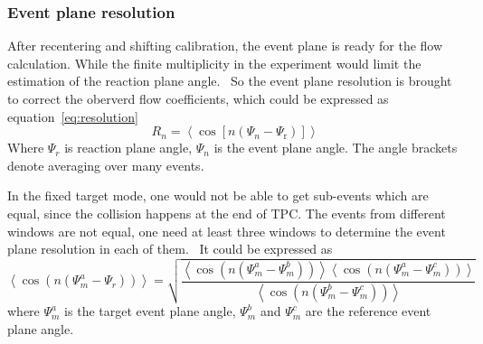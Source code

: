 \subsubsection{Event plane resolution}
After recentering and shifting calibration, the event plane is ready for the flow calculation. 
While the finite multiplicity in the experiment would limit the estimation of the reaction plane angle.~\cite{voloshin2008collective}
So the event plane resolution is brought to correct the oberverd flow coefficients, which could be expressed as equation~\ref{eq:resolution}
\begin{equation}
R_n=\left\langle\cos \left[n\left(\Psi_n-\Psi_{\mathrm{r}}\right)\right]\right\rangle
\label{eq:resolution}
\end{equation}
Where $\Psi_r$ is reaction plane angle, $\Psi_n$ is the event plane angle.
The angle brackets denote averaging over many events. 

In the fixed target mode, one would not be able to get sub-events which are equal, since the collision happens at 
the end of TPC. The events from different windows are not equal, one need at least three windows to determine
the event plane resolution in each of them.~\cite{poskanzer1998methods} It could be expressed as
\begin{equation}
    \left\langle\cos \left(n\left(\Psi_m^a-\Psi_r\right)\right)\right\rangle=\sqrt{\frac{\left\langle\cos \left(n\left(\Psi_m^a-\Psi_m^b\right)\right)\right\rangle\left\langle\cos \left(n\left(\Psi_m^a-\Psi_m^c\right)\right)\right\rangle}{\left\langle\cos \left(n\left(\Psi_m^b-\Psi_m^c\right)\right)\right\rangle}}
\label{eq:threeSub_res}
\end{equation}
where $\Psi_m^a$ is the target event plane angle,  $\Psi_m^b$ and $\Psi_m^c$ are the reference event plane angle.

